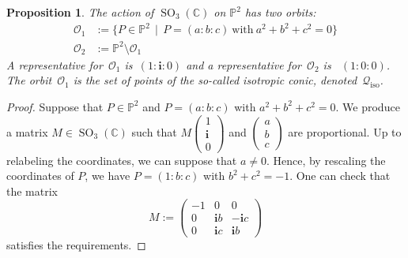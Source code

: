 \documentclass{amsart}
\theoremstyle{plain}
\newtheorem{prop}[lemma]{Proposition}
\theoremstyle{definition}
\newcommand{\C}{\mathbb{C}}
\newcommand{\p}{\mathbb{P}}
\newcommand{\iso}{\mathcal{Q}_{\mathrm{iso}}}
\newcommand{\SO}{\operatorname{SO}}
\newcommand{\iii}{\textbf{i}}
\begin{document}
\begin{prop}
\label{two_orbits}
The action of $\SO_3(\C)$ on $\p^2$ has two orbits:
%
\begin{align*}
  \mathcal{O}_1 &:=
  \bigl\{
    P \in \p^2 \, \mid \,
    P = (a:b:c) \ \text{with} \ a^2 + b^2 + c^2 = 0
  \bigr\} \\
  \mathcal{O}_2 &:= \p^2 \setminus \mathcal{O}_1
\end{align*}
%
A representative for~$\mathcal{O}_1$ is~$(1:\iii:0)$ and a
representative for~$\mathcal{O}_2$ is~ $(1:0:0)$.
The orbit~$\mathcal{O}_1$ is the set of points of the so-called \emph{isotropic conic}, denoted~$\iso$.
\end{prop}
\begin{proof}
Suppose that $P \in \p^2$ and $P = (a:b:c)$ with $a^2 + b^2 + c^2 = 0$.
We produce a matrix $M \in \SO_3(\C)$ such that $M \left(\begin{smallmatrix} 1 \\ \iii \\ 0 \end{smallmatrix}\right)$ and $\left(\begin{smallmatrix} a \\ b \\ c \end{smallmatrix}\right)$ are proportional.
Up to relabeling the coordinates, we can suppose that $a \neq 0$.
Hence, by rescaling the coordinates of $P$, we have $P = (1: b: c)$ with $b^2 + c^2 = -1$.
One can check that the matrix
%
\[
  M :=
  \begin{pmatrix}
    -1 & 0 & 0 \\
    0 & \iii b & -\iii c \\
    0 & \iii c & \iii b
  \end{pmatrix}
\]
%
satisfies the requirements.


\end{proof}
\end{document}
